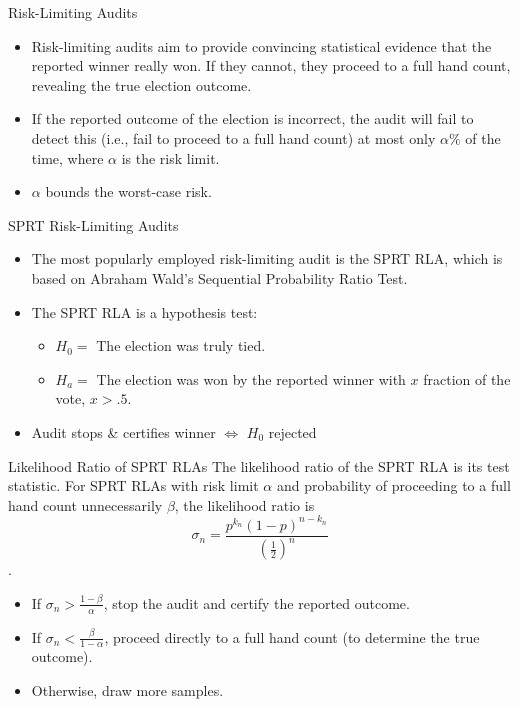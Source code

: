 \documentclass{beamer}
\begin{document}
\begin{frame}{Risk-Limiting Audits}
\begin{itemize}
    \item Risk-limiting audits aim to provide convincing statistical evidence that the reported winner really won. If they cannot, they proceed to a full hand count, revealing the true election outcome.
    \vskip 1cm
    \item If the reported outcome of the election is incorrect, the audit will fail to detect this (i.e., fail to proceed to a full hand count) at most only $\alpha \%$ of the time, where $\alpha$ is the risk limit.
    \vskip 1cm
    \item $\alpha$ bounds the worst-case risk.

\end{itemize}
\end{frame}

\begin{frame}{SPRT Risk-Limiting Audits}
\begin{itemize}
    \item The most popularly employed risk-limiting audit is the SPRT RLA, which is based on Abraham Wald's Sequential Probability Ratio Test.
    \vskip 1cm
    \item The SPRT RLA is a hypothesis test:
    \begin{itemize}
        \item $H_0 =$ The election was truly tied.
        \item $H_a =$ The election was won by the reported winner with $x$ fraction of the vote, $x > .5$.
    \end{itemize}
    \vskip 1cm
    \item Audit stops \& certifies winner $\iff$ $H_0$ rejected
\end{itemize}
\end{frame}

\begin{frame}{Likelihood Ratio of SPRT RLAs}
The likelihood ratio of the SPRT RLA is its test statistic. For SPRT RLAs with risk limit $\alpha$ and probability of proceeding to a full hand count unnecessarily $\beta$, the likelihood ratio is $$\sigma_n = \frac{p^{k_n} (1-p)^{n-k_n}}{(\frac{1}{2})^n}$$.
\begin{itemize}
    \item If $\sigma_n > \frac{1-\beta}{\alpha}$, stop the audit and certify the reported outcome.
    \item If $\sigma_n < \frac{\beta}{1-\alpha}$, proceed directly to a full hand count (to determine the true outcome).
    \item Otherwise, draw more samples.
\end{itemize}
    
\end{frame}
\end{document}

